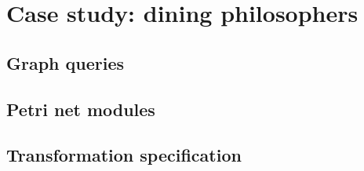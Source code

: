 \chapter{Case study: dining philosophers}
\label{app:phils}

\section{Graph queries}



\section{Petri net modules}





\section{Transformation specification}

